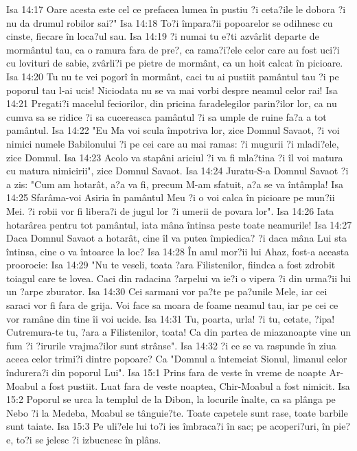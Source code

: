 Isa 14:17  Oare acesta este cel ce prefacea lumea în pustiu ?i ceta?ile le dobora ?i nu da drumul robilor sai?"
Isa 14:18  To?i împara?ii popoarelor se odihnesc cu cinste, fiecare în loca?ul sau.
Isa 14:19  ?i numai tu e?ti azvârlit departe de mormântul tau, ca o ramura fara de pre?, ca rama?i?ele celor care au fost uci?i cu lovituri de sabie, zvârli?i pe pietre de mormânt, ca un hoit calcat în picioare.
Isa 14:20  Tu nu te vei pogorî în mormânt, caci tu ai pustiit pamântul tau ?i pe poporul tau l-ai ucis! Niciodata nu se va mai vorbi despre neamul celor rai!
Isa 14:21  Pregati?i macelul feciorilor, din pricina faradelegilor parin?ilor lor, ca nu cumva sa se ridice ?i sa cucereasca pamântul ?i sa umple de ruine fa?a a tot pamântul.
Isa 14:22  "Eu Ma voi scula împotriva lor, zice Domnul Savaot, ?i voi nimici numele Babilonului ?i pe cei care au mai ramas: ?i mugurii ?i mladi?ele, zice Domnul.
Isa 14:23  Acolo va stapâni ariciul ?i va fi mla?tina ?i îl voi matura cu matura nimicirii", zice Domnul Savaot.
Isa 14:24  Juratu-S-a Domnul Savaot ?i a zis: "Cum am hotarât, a?a va fi, precum M-am sfatuit, a?a se va întâmpla!
Isa 14:25  Sfarâma-voi Asiria în pamântul Meu ?i o voi calca în picioare pe mun?ii Mei. ?i robii vor fi libera?i de jugul lor ?i umerii de povara lor".
Isa 14:26  Iata hotarârea pentru tot pamântul, iata mâna întinsa peste toate neamurile!
Isa 14:27  Daca Domnul Savaot a hotarât, cine îl va putea împiedica? ?i daca mâna Lui sta întinsa, cine o va întoarce la loc?
Isa 14:28  În anul mor?ii lui Ahaz, fost-a aceasta proorocie:
Isa 14:29  "Nu te veseli, toata ?ara Filistenilor, fiindca a fost zdrobit toiagul care te lovea. Caci din radacina ?arpelui va ie?i o vipera ?i din urma?ii lui un ?arpe zburator.
Isa 14:30  Cei sarmani vor pa?te pe pa?unile Mele, iar cei saraci vor fi fara de grija. Voi face sa moara de foame neamul tau, iar pe cei ce vor ramâne din tine îi voi ucide.
Isa 14:31  Tu, poarta, urla! ?i tu, cetate, ?ipa! Cutremura-te tu, ?ara a Filistenilor, toata! Ca din partea de miazanoapte vine un fum ?i ?irurile vrajma?ilor sunt strânse".
Isa 14:32  ?i ce se va raspunde în ziua aceea celor trimi?i dintre popoare? Ca "Domnul a întemeiat Sionul, limanul celor îndurera?i din poporul Lui".
Isa 15:1  Prins fara de veste în vreme de noapte Ar-Moabul a fost pustiit. Luat fara de veste noaptea, Chir-Moabul a fost nimicit.
Isa 15:2  Poporul se urca la templul de la Dibon, la locurile înalte, ca sa plânga pe Nebo ?i la Medeba, Moabul se tânguie?te. Toate capetele sunt rase, toate barbile sunt taiate.
Isa 15:3  Pe uli?ele lui to?i ies îmbraca?i în sac; pe acoperi?uri, în pie?e, to?i se jelesc ?i izbucnesc în plâns.
